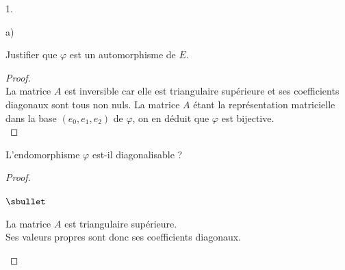 \begin{noliste}{1.}
\begin{noliste}{a)}
  \item Justifier que $\varphi$ est un automorphisme de $E$.

    \begin{proof}~\\
      La matrice $A$ est inversible car elle est triangulaire
      supérieure et ses coefficients diagonaux sont tous non
      nuls. La matrice $A$ étant la représentation matricielle dans la
      base $(e_0, e_1, e_2)$ de $\varphi$, on en déduit que $\varphi$
      est bijective.%
      ~\\[-1.2cm]
    \end{proof}

  \item L'endomorphisme $\varphi$ est-il diagonalisable ?

    \begin{proof}~%
      \begin{noliste}{$\sbullet$}
      \item La matrice $A$ est triangulaire supérieure. \\
        Ses valeurs propres sont donc ses coefficients diagonaux.%


\end{noliste}
\end{proof}
\end{noliste}
\end{noliste}
